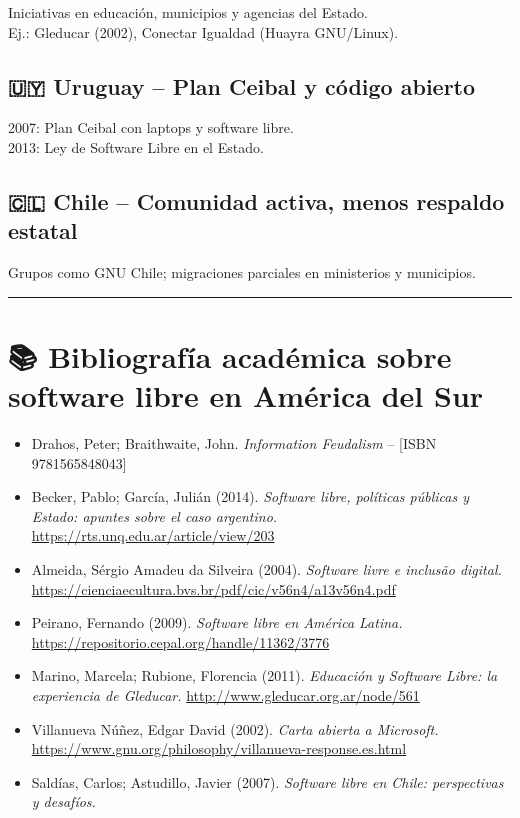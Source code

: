 \documentclass[
  letterpaper,
  DIV=11,
  numbers=noendperiod]{scrreprt}
\providecommand{\tightlist}{%
  \setlength{\itemsep}{0pt}\setlength{\parskip}{0pt}}
\begin{document}
Iniciativas en educación, municipios y agencias del Estado.\\
Ej.: Gleducar (2002), Conectar Igualdad (Huayra GNU/Linux).

\subsection{🇺🇾 Uruguay -- Plan Ceibal y código
abierto}\label{uruguay-plan-ceibal-y-cuxf3digo-abierto}

2007: Plan Ceibal con laptops y software libre.\\
2013: Ley de Software Libre en el Estado.

\subsection{🇨🇱 Chile -- Comunidad activa, menos respaldo
estatal}\label{chile-comunidad-activa-menos-respaldo-estatal}

Grupos como GNU Chile; migraciones parciales en ministerios y
municipios.

\begin{center}\rule{0.5\linewidth}{0.5pt}\end{center}

\section{📚 Bibliografía académica sobre software libre en América del
Sur}\label{bibliografuxeda-acaduxe9mica-sobre-software-libre-en-amuxe9rica-del-sur}

\begin{itemize}
\tightlist
\item
  Drahos, Peter; Braithwaite, John. \emph{Information Feudalism} --
  {[}ISBN 9781565848043{]}
\item
  Becker, Pablo; García, Julián (2014). \emph{Software libre, políticas
  públicas y Estado: apuntes sobre el caso argentino.}
  \url{https://rts.unq.edu.ar/article/view/203}
\item
  Almeida, Sérgio Amadeu da Silveira (2004). \emph{Software livre e
  inclusão digital.}
  \url{https://cienciaecultura.bvs.br/pdf/cic/v56n4/a13v56n4.pdf}
\item
  Peirano, Fernando (2009). \emph{Software libre en América Latina.}
  \url{https://repositorio.cepal.org/handle/11362/3776}
\item
  Marino, Marcela; Rubione, Florencia (2011). \emph{Educación y Software
  Libre: la experiencia de Gleducar.}
  \url{http://www.gleducar.org.ar/node/561}
\item
  Villanueva Núñez, Edgar David (2002). \emph{Carta abierta a
  Microsoft.}
  \url{https://www.gnu.org/philosophy/villanueva-response.es.html}
\item
  Saldías, Carlos; Astudillo, Javier (2007). \emph{Software libre en
  Chile: perspectivas y desafíos.}
\end{itemize}
\end{document}
